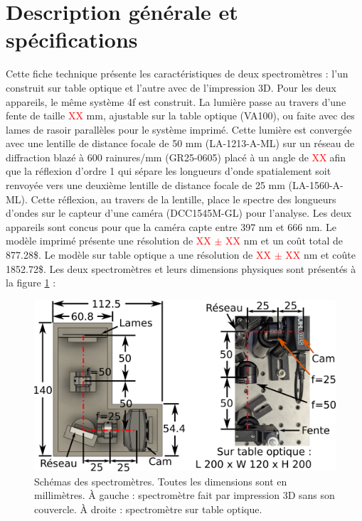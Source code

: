 \documentclass[11pt,letterpaper]{article}
\begin{document}
\section{Description générale et spécifications}

Cette fiche technique présente les caractéristiques de deux spectromètres : l'un construit sur 
table optique et l'autre avec de l'impression 3D. Pour les deux appareils, le même système 4f
est construit. La lumière passe au travers d'une fente de taille \textcolor{red}{XX} mm, 
ajustable sur la table optique (VA100), ou faite avec des lames de rasoir parallèles pour le
système imprimé. Cette lumière est convergée avec une lentille de distance focale de 50 mm 
(LA-1213-A-ML) sur un réseau de diffraction blazé à 600 rainures/mm (GR25-0605) placé à un
angle de \textcolor{red}{XX}\degree $\;$afin que la réflexion d'ordre 1 qui sépare les
longueurs d'onde spatialement soit renvoyée vers une deuxième lentille de distance focale
de 25 mm (LA-1560-A-ML). Cette réflexion, au travers de la lentille, place le spectre des 
longueurs d'ondes sur le capteur d'une caméra (DCC1545M-GL) pour l'analyse. Les deux appareils
sont concus pour que la caméra capte entre 397 nm et 666 nm. Le modèle imprimé présente une
résolution de \textcolor{red}{XX $\pm$ XX} nm et un coût total de 877.28\$. Le modèle sur
table optique a une résolution de \textcolor{red}{XX $\pm$ XX} nm et coûte 1852.72\$. Les
deux spectromètres et leurs dimensions physiques sont présentés à la figure 
\ref{schema_spectros} :


\begin{figure}[H]
  \centering
  \includegraphics[scale=1.75]{schema_spectros.png}
  \caption{Schémas des spectromètres. Toutes les dimensions sont en millimètres. À gauche : spectromètre fait par impression 3D sans son couvercle. À droite : spectromètre sur table optique.}
  \label{schema_spectros}
\end{figure}
\end{document}
